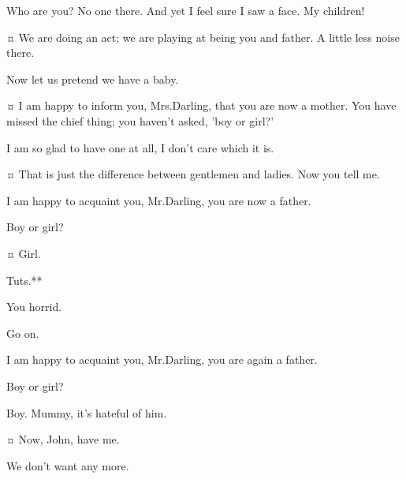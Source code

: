 \begin{drama}

\mrsdarlingspeaks
Who are you?
No one there.
And yet I feel sure I saw a face.
My children!

\johnspeaks {}¤
We are doing an act; we are playing at being you and father.
A little less noise there.

\wendyspeaks
Now let us pretend we have a baby.

\johnspeaks {}¤
I am happy to inform you, Mrs.\@ Darling, that you are now a mother.
You have missed the chief thing; you haven't asked, 'boy or girl?'

\wendyspeaks
I am so glad to have one at all, I don't care which it is.

\johnspeaks {}¤
That is just the difference between gentlemen and ladies.
Now you tell me.

\wendyspeaks
I am happy to acquaint you, Mr.\@ Darling, you are now a father.

\johnspeaks
Boy or girl?

\wendyspeaks {}¤
Girl.

\johnspeaks
Tuts.**

\wendyspeaks
You horrid.

\johnspeaks
Go on.

\wendyspeaks
I am happy to acquaint you, Mr.\@ Darling, you are again a father.

\johnspeaks
Boy or girl?

\wendyspeaks
Boy.
Mummy, it's hateful of him.


\michaelspeaks {}¤
Now, John, have me.

\johnspeaks
We don't want any more.


\end{drama}
